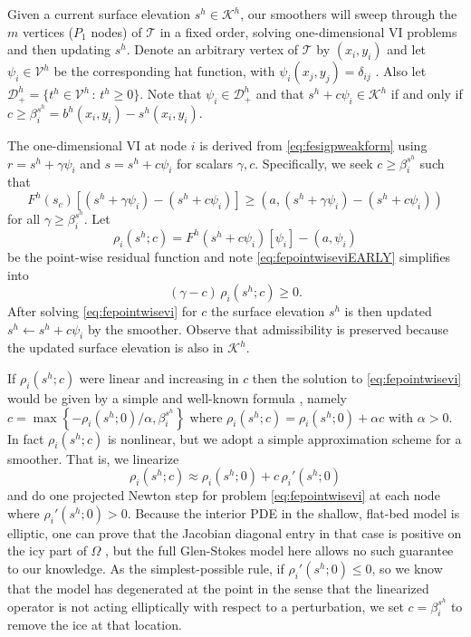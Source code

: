 \documentclass[letterpaper,final,12pt,reqno]{amsart}
\theoremstyle{claim}
\newcommand{\ip}[2]{\left(#1,#2\right)}
\numberwithin{equation}{section}
\numberwithin{figure}{section}
\numberwithin{table}{section}
\numberwithin{theorem}{section}
\begin{document}
Given a current surface elevation $s^h\in \mathcal{K}^h$, our smoothers will sweep through the $m$ vertices ($P_1$ nodes) of $\mathcal{T}$ in a fixed order, solving one-dimensional VI problems and then updating $s^h$.   Denote an arbitrary vertex of $\mathcal{T}$ by $(x_i,y_i)$ and let $\psi_i \in \mathcal{V}^h$ be the corresponding hat function, with $\psi_i(x_j,y_j)=\delta_{ij}$ \cite{Elmanetal2014}.  Also let $\mathcal{D}_+^h = \{t^h \in \mathcal{V}^h \,:\, t^h \ge 0\}$.  Note that $\psi_i \in \mathcal{D}_+^h$ and that $s^h + c \psi_i \in \mathcal{K}^h$ if and only if $c\ge \beta_i^{s^h} = b^h(x_i,y_i) - s^h(x_i,y_i)$.

The one-dimensional VI at node $i$ is derived from \eqref{eq:fesigpweakform} using $r = s^h+\gamma \psi_i$ and $s = s^h+c \psi_i$ for scalars $\gamma,c$.  Specifically, we seek $c \ge \beta_i^{s^h}$ such that
\begin{equation}
F^h(s_c)[(s^h+\gamma \psi_i) - (s^h+c \psi_i)] \ge \ip{a}{(s^h+\gamma \psi_i) - (s^h+c \psi_i)} \label{eq:fepointwiseviEARLY}
\end{equation}
for all $\gamma \ge \beta_i^{s^h}$.  Let
\begin{equation}
\rho_i(s^h; c) = F^h(s^h+c\psi_i)[\psi_i] - \ip{a}{\psi_i} \label{eq:ferhoi}
\end{equation}
be the point-wise residual function and note \eqref{eq:fepointwiseviEARLY} simplifies into
\begin{equation}
(\gamma - c) \,\rho_i(s^h; c) \ge 0. \label{eq:fepointwisevi}
\end{equation}
After solving \eqref{eq:fepointwisevi} for $c$ the surface elevation $s^h$ is then updated $s^h \gets s^h + c \psi_i$ by the smoother.  Observe that admissibility is preserved because the updated surface elevation is also in $\mathcal{K}^h$.

If $\rho_i(s^h; c)$ were linear and increasing in $c$ then the solution to \eqref{eq:fepointwisevi} would be given by a simple and well-known formula \cite[formula (4.4), for example]{GraeserKornhuber2009}, namely $c = \max\left\{-\rho_i(s^h; 0)/\alpha, \beta_i^{s^h}\right\}$ where $\rho_i(s^h; c) = \rho_i(s^h; 0) + \alpha c$ with $\alpha > 0$.  In fact $\rho_i(s^h; c)$ is nonlinear, but we adopt a simple approximation scheme for a smoother.  That is, we linearize
\begin{equation}
\rho_i(s^h; c) \approx \rho_i(s^h; 0) + c\, \rho_i'(s^h; 0) \label{eq:rhoapprox}
\end{equation}
and do one projected Newton step for problem \eqref{eq:fepointwisevi} at each node where $\rho_i'(s^h; 0) > 0$.  Because the interior PDE in the shallow, flat-bed model is elliptic, one can prove that the Jacobian diagonal entry in that case is positive on the icy part of $\Omega$ \cite{JouvetBueler2012}, but the full Glen-Stokes model here allows no such guarantee to our knowledge.  As the simplest-possible rule, if $\rho_i'(s^h; 0) \le 0$, so we know that the model has degenerated at the point in the sense that the linearized operator is not acting elliptically with respect to a perturbation, we set $c = \beta_i^{s^h}$ to remove the ice at that location.  %
\end{document}
